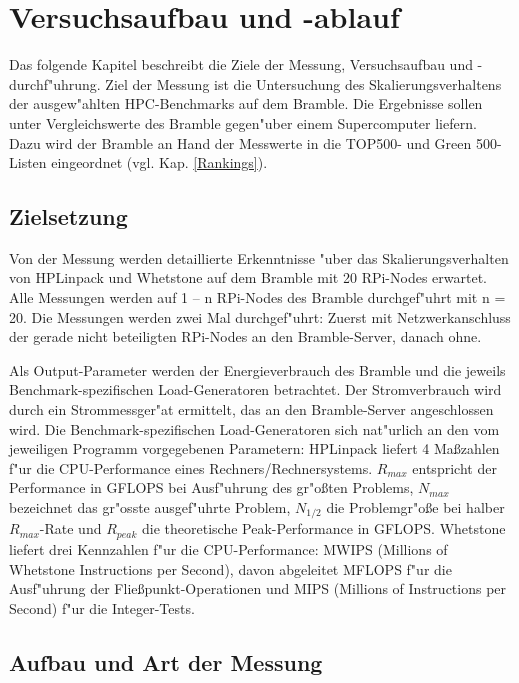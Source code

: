 \chapter{Versuchsaufbau und -ablauf}\label{Kapitel 3}
Das folgende Kapitel beschreibt die Ziele der Messung, Versuchsaufbau und -durchf"uhrung. Ziel der Messung ist die Untersuchung des Skalierungsverhaltens der ausgew"ahlten HPC-Benchmarks auf dem Bramble. Die Ergebnisse sollen unter Vergleichswerte des Bramble gegen"uber einem Supercomputer liefern. Dazu wird der Bramble an Hand der Messwerte in die TOP500- und Green 500-Listen eingeordnet (vgl. Kap. \ref{Rankings}). 

\section{Zielsetzung}

Von der Messung werden detaillierte Erkenntnisse "uber das Skalierungsverhalten von HPLinpack und Whetstone auf dem Bramble mit 20 RPi-Nodes erwartet. Alle Messungen werden auf 1 -- n RPi-Nodes des Bramble durchgef"uhrt mit n = 20. Die Messungen werden zwei Mal durchgef"uhrt: Zuerst mit Netzwerkanschluss der gerade nicht beteiligten RPi-Nodes an den Bramble-Server, danach ohne. 

Als Output-Parameter werden der Energieverbrauch des Bramble und die jeweils Benchmark-spezifischen Load-Generatoren betrachtet. Der Stromverbrauch wird durch ein Strommessger"at ermittelt, das an den Bramble-Server angeschlossen wird. Die Benchmark-spezifischen Load-Generatoren sich nat"urlich an den vom jeweiligen Programm vorgegebenen Parametern: HPLinpack liefert 4 Ma\ss zahlen f"ur die CPU-Performance eines Rechners/Rechnersystems. $R_{max}$ entspricht der Performance in GFLOPS bei Ausf"uhrung des gr"o\ss ten Problems, $N_{max}$ bezeichnet das gr"osste ausgef"uhrte Problem, $N_{1/2}$ die Problemgr"o\ss e bei halber $R_{max}$-Rate und $R_{peak}$ die theoretische Peak-Performance in GFLOPS. Whetstone liefert drei Kennzahlen f"ur die CPU-Performance: MWIPS (Millions of Whetstone Instructions per Second), davon abgeleitet MFLOPS f"ur die Ausf"uhrung der Flie\ss punkt-Operationen und MIPS (Millions of Instructions per Second) f"ur die Integer-Tests. 

\section{Aufbau und Art der Messung}\label{Aufbau}


